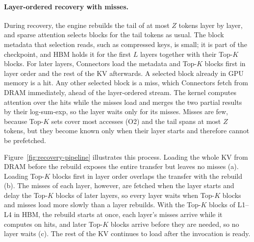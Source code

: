 \paragraph{Layer-ordered recovery with misses.}
During recovery, the engine rebuilds the tail of at most $Z$ tokens layer
by layer, and sparse attention selects blocks for the tail tokens as
usual. The block metadata that selection reads, such as compressed keys,
is small; it is part of the checkpoint, and HBM holds it for the first $L$
layers together with their Top-$K$ blocks. For later layers, Connectors
load the metadata and Top-$K$ blocks first in layer order and the rest of
the KV afterwards. A selected block already in GPU memory is a hit. Any
other selected block is a miss, which Connectors fetch from DRAM
immediately, ahead of the layer-ordered stream. The kernel computes
attention over the hits while the misses load and merges the two partial
results by their log-sum-exp, so the layer waits only for its misses.
Misses are few, because Top-$K$ sets cover most accesses (O2) and the tail
spans at most $Z$ tokens, but they become known only when their layer
starts and therefore cannot be prefetched.

Figure~\ref{fig:recovery-pipeline} illustrates this process. Loading the
whole KV from DRAM before the rebuild exposes the entire transfer but
leaves no misses (a). Loading Top-$K$ blocks first in layer order overlaps
the transfer with the rebuild (b). The misses of each layer, however, are
fetched when the layer starts and delay the Top-$K$ blocks of later
layers, so every layer waits when Top-$K$ blocks and misses load more
slowly than a layer rebuilds. With the Top-$K$ blocks of L1--L4 in HBM,
the rebuild starts at once, each layer's misses arrive while it computes
on hits, and later Top-$K$ blocks arrive before they are needed, so no
layer waits (c). The rest of the KV continues to load after the
invocation is ready.

